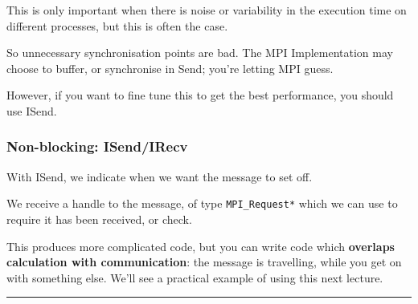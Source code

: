 This is only important when there is noise or variability in the
execution time on different processes, but this is often the case.

So unnecessary synchronisation points are bad. The MPI Implementation
may choose to buffer, or synchronise in Send; you're letting MPI guess.

However, if you want to fine tune this to get the best performance, you
should use ISend.

\subsubsection{Non-blocking: ISend/IRecv}\label{non-blocking-isendirecv}

With ISend, we indicate when we want the message to set off.

We receive a handle to the message, of type \texttt{MPI\_Request*} which
we can use to require it has been received, or check.

This produces more complicated code, but you can write code which
\textbf{overlaps calculation with communication}: the message is
travelling, while you get on with something else. We'll see a practical
example of using this next lecture.

\begin{center}\rule{3in}{0.4pt}\end{center}

